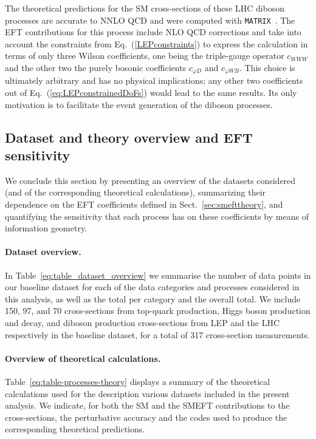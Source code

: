 The theoretical predictions for the SM cross-sections of these LHC diboson
processes are accurate to NNLO QCD and were computed with
{\tt MATRIX}~\cite{Grazzini:2017mhc}.
The EFT contributions for this process include NLO QCD corrections
and take into account the constraints from Eq.~(\ref{LEPconstraints})
to express the calculation in terms of only three Wilson
coefficients, one being the triple-gauge operator $c_{WWW}$
and the other two the purely bosonic coefficients
$c_{\varphi D}$ and $c_{\varphi W B}$.
%
This choice is ultimately arbitrary and has no physical implications;
any other two coefficients
out of Eq.~(\ref{eq:LEPconstrainedDoFs}) would lead to
the same results. Its only motivation is to facilitate the event generation of
the diboson processes.

\subsection{Dataset and theory overview and EFT sensitivity}

We conclude this section by presenting an overview of the datasets
considered (and of the corresponding theoretical
calculations), summarizing their dependence
on the EFT coefficients defined in Sect.~\ref{sec:smefttheory},
and
quantifying the sensitivity that each process
has on these coefficients by means of information geometry.

\paragraph{Dataset overview.}
%
In Table~\ref{eq:table_dataset_overview} we summarise the number of data points in our baseline dataset
for each of the data categories and processes considered in this analysis, as well
as the total per category and the overall total.
%
We include 150, 97, and 70 cross-sections from top-quark production, Higgs boson production
and decay, and diboson production
cross-sections from LEP and the LHC respectively in the baseline dataset,
for a total of 317 cross-section measurements.



\paragraph{Overview of theoretical calculations.}
%
Table~\ref{eq:table-processes-theory} displays a
summary of the theoretical calculations used for the 
description various datasets included in the 
present analysis. We indicate, for both the SM and the SMEFT contributions 
to the cross-sections, the perturbative accuracy and the codes used to 
produce the corresponding theoretical predictions.


